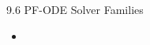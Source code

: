 \begin{frame}{9.6 PF-ODE Solver Families}
    \begin{itemize}
        \item
    \end{itemize}
\end{frame}
